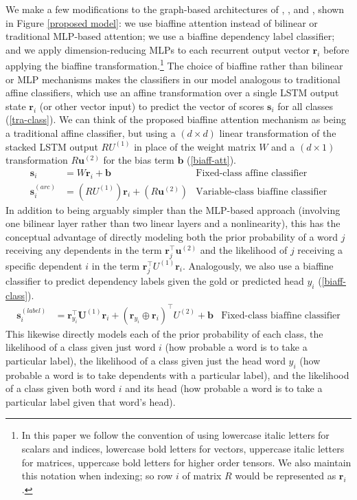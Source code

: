 \documentclass[11pt,a4paper]{article}
\begin{document}
We make a few modifications to the graph-based architectures of \citet{KiperwasserGoldberg2016}, \citet{Hashimotoetal2016}, and \citet{Chengetal2016}, shown in Figure \ref{proposed model}: we use biaffine attention instead of bilinear or traditional MLP-based attention; we use a biaffine dependency label classifier; and we apply dimension-reducing MLPs to each recurrent output vector $\mathbf{r}_i$ before applying the biaffine transformation.\footnote{In this paper we follow the convention of using lowercase italic letters for scalars and indices, lowercase bold letters for vectors, uppercase italic letters for matrices, uppercase bold letters for higher order tensors. We also maintain this notation when indexing; so row $i$ of matrix $R$ would be represented as $\mathbf{r}_i$.} The choice of biaffine rather than bilinear or MLP mechanisms makes the classifiers in our model analogous to traditional affine classifiers, which use an affine transformation over a single LSTM output state $\mathbf{r}_i$ (or other vector input) to predict the vector of scores $\mathbf{s}_i$ for all classes (\ref{tra-class}). We can think of the proposed biaffine attention mechanism as being a traditional affine classifier, but using a $(d \times d)$ linear transformation of the stacked LSTM output $RU^{(1)}$ in place of the weight matrix $W$ and a $(d \times 1)$ transformation $R\mathbf{u}^{(2)}$ for the bias term $\mathbf{b}$ (\ref{biaff-att}). 
\begin{align}
  \label{tra-class}\mathbf{s}_i &= W\mathbf{r}_i + \mathbf{b} & \text{Fixed-class affine classifier}\\
  \label{biaff-att}\mathbf{s}_i^{(arc)} &= \left(RU^{(1)}\right)\mathbf{r}_i + \left(R\mathbf{u}^{(2)}\right) & \text{Variable-class biaffine classifier}
\end{align}
In addition to being arguably simpler than the MLP-based approach (involving one bilinear layer rather than two linear layers and a nonlinearity), this has the conceptual advantage of directly modeling both the prior probability of a word $j$ receiving any dependents in the term $\mathbf{r}_j^\top\mathbf{u}^{(2)}$ and the likelihood of $j$ receiving a specific dependent $i$ in the term $\mathbf{r}^\top_jU^{(1)}\mathbf{r}_i$. Analogously, we also use a biaffine classifier to predict dependency labels given the gold or predicted head $y_i$ (\ref{biaff-class}).
\begin{align}
  \label{biaff-class}\mathbf{s}_i^{(label)} &= \mathbf{r}_{y_i}^\top \mathbf{U}^{(1)}\mathbf{r}_i + (\mathbf{r}_{y_i} \oplus \mathbf{r}_i)^\top U^{(2)} + \mathbf{b} & \text{Fixed-class biaffine classifier}
\end{align}
This likewise directly models each of the prior probability of each class, the likelihood of a class given just word $i$ (how probable a word is to take a particular label), the likelihood of a class given just the head word $y_i$ (how probable a word is to take dependents with a particular label), and the likelihood of a class given both word $i$ and its head (how probable a word is to take a particular label given that word's head). 
 
\end{document}
